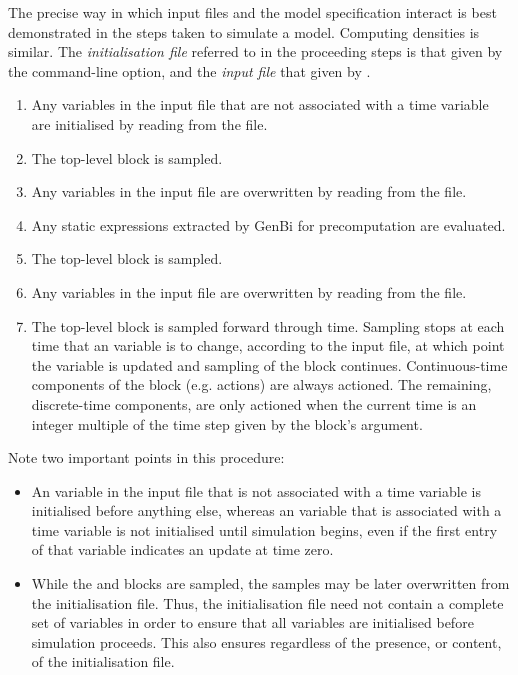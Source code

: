 The precise way in which input files and the model specification interact is
best demonstrated in the steps taken to simulate a model. Computing densities
is similar. The \emph{initialisation file} referred to in the proceeding steps
is that given by the  command-line option, and the
\emph{input file} that given by .
\begin{enumerate}
\item Any  variables in the input file that are not associated with
  a time variable are initialised by reading from the file.
\item The  top-level block is sampled.
\item Any  variables in the input file are overwritten by reading
  from the file.
\item Any static expressions extracted by GenBi for precomputation are
  evaluated.
\item The  top-level block is sampled.
\item Any  variables in the input file are overwritten by reading
  from the file.
\item The  top-level block is sampled forward through
  time. Sampling stops at each time that an  variable is to
  change, according to the input file, at which point the 
  variable is updated and sampling of the  block
  continues. Continuous-time components of the
   block (e.g.  actions) are always
  actioned. The remaining, discrete-time components, are
  only actioned when the current time is an integer multiple of the time step
  given by the  block's  argument.
\end{enumerate}

Note two important points in this procedure:
\begin{itemize}
\item An  variable in the input file that is not associated with a
  time variable is initialised before anything else, whereas an 
  variable that is associated with a time variable is not initialised until
  simulation begins, even if the first entry of that variable indicates an
  update at time zero.
\item While the  and  blocks are
  sampled, the samples may be later overwritten from the initialisation
  file. Thus, the initialisation file need not contain a complete set of
  variables in order to ensure that all variables are initialised before
  simulation proceeds. This also ensures
  regardless of the presence, or content, of the initialisation file.
\end{itemize}

